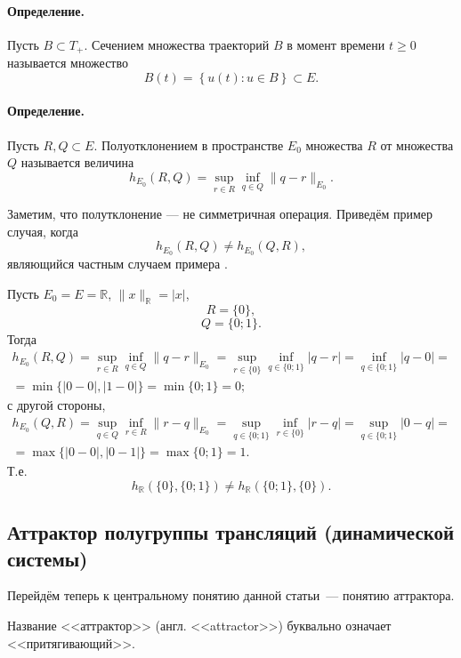 \paragraph{Определение.}

Пусть $B \subset T_+$.
Сечением множества траекторий $B$ в момент времени $t \geq 0$ называется множество
$$
	B(t)=\left\{u(t) : u \in B \right\} \subset E.
$$


\paragraph{Определение.}

Пусть $R,Q \subset E$.
Полуотклонением в пространстве $E_0$ множества $R$ от множества $Q$ называется величина
$$
	h_{E_0}(R,Q) = \sup_{r\in R} \inf_{q \in Q} \| q - r \|_{E_0}.
$$

Заметим, что полутклонение --- не симметричная операция.
Приведём пример случая, когда
$$
	h_{E_0}(R,Q) \neq h_{E_0}(Q,R),
$$
являющийся частным случаем примера \cite[теорема 1.2.41]{mnogozn}.

Пусть $E_0 = E = \mathbb{R}$, $\|x\|_{\mathbb{R}} = |x|$,
$$
	R =\{0\},
$$
$$
	Q=\{0;1\}.
$$
Тогда
\begin{multline*}
	h_{E_0}(R,Q) =
	\sup_{r\in R} \inf_{q \in Q} \| q - r \|_{E_0} =
	\sup_{r\in \{0\}} \inf_{q \in \{0;1\}} | q - r | =
	\inf_{q \in \{0;1\}} | q - 0 | =
	\\ =
	\min\{|0-0|,|1-0|\} =
	\min\{0;1\} =
	0;
\end{multline*}
с другой стороны,
\begin{multline*}
	h_{E_0}(Q,R) =
	\sup_{q \in Q} \inf_{r\in R} \| r - q \|_{E_0} =
	\sup_{q \in \{0;1\}} \inf_{r\in \{0\}} | r - q | =
	\sup_{q \in \{0;1\}} | 0 - q | =
	\\ =
	\max\{|0-0|,|0-1|\} =
	\max\{0;1\} =
	1.
\end{multline*}
Т.е.
$$
	h_{\mathbb{R}}\left( \{0\}, \{0;1\}\right) \neq h_{\mathbb{R}}\left( \{0;1\} , \{0\} \right).
$$


\subsection{Аттрактор полугруппы трансляций (динамической системы)}

Перейдём теперь к центральному понятию данной статьи~--- понятию аттрактора.

Название <<аттрактор>> (англ. <<attractor>>) буквально означает <<притягивающий>>.



